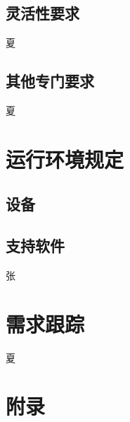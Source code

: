 \documentclass[UTF8]{ctexart}
\begin{document}
\subsection{灵活性要求}
夏
\subsection{其他专门要求}
夏
\section{运行环境规定}
\subsection{设备}

\subsection{支持软件}
张
\section{需求跟踪}
夏
\section{附录}
\end{document}
